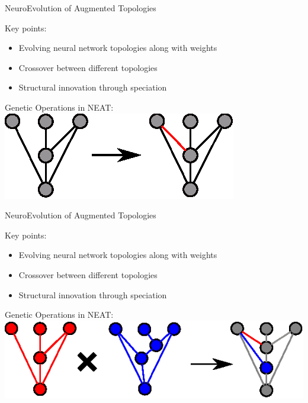 \documentclass[6pt]{beamer}
\begin{document}
\begin{frame}{NeuroEvolution of Augmented Topologies}
\begin{block}{Key points:}
\begin{itemize}
\item Evolving neural network topologies along with weights
\item Crossover between different topologies
\item Structural innovation through speciation
\end{itemize}
\end{block}
\begin{block}{Genetic Operations in NEAT:}
\centering
\includegraphics[height=0.25\textheight]{../Figures/Misc/neatAddLink.eps}
\end{block}
\end{frame}

\begin{frame}{NeuroEvolution of Augmented Topologies}
\begin{block}{Key points:}
\begin{itemize}
\item Evolving neural network topologies along with weights
\item Crossover between different topologies
\item Structural innovation through speciation
\end{itemize}
\end{block}
\begin{block}{Genetic Operations in NEAT:}
\centering
\includegraphics[height=0.25\textheight]{../Figures/Misc/neatCrossOver.eps}
\end{block}
\end{frame}
\end{document}
